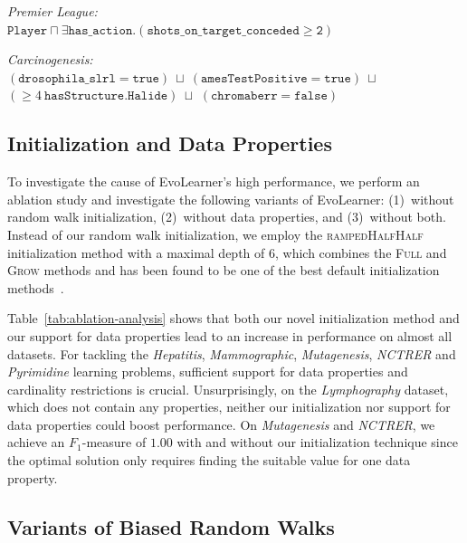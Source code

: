 \medskip

\noindent
\emph{Premier League:}\quad\\
$\texttt{Player} \sqcap \exists \texttt{has\_action.}(\texttt{shots\_on\_target\_conceded} \geq \texttt{2})$

\medskip

\noindent
\emph{Carcinogenesis:}\quad\\
$(\texttt{drosophila\_slrl} = \texttt{true}) \ \sqcup \ (\texttt{amesTestPositive} = \texttt{true}) \ \sqcup$
$(\geq 4 \ \texttt{hasStructure.Halide}) \ \sqcup$
$(\texttt{chromaberr} = \texttt{false})$



\subsection{Initialization and Data Properties}%
\label{subsec:evaluation-ablation-analysis}

To investigate the cause of EvoLearner's high performance, we perform an ablation study and investigate the following variants of EvoLearner: (1)~without random walk initialization, (2)~without data properties, and (3)~without both. Instead of our random walk initialization, we employ the \textsc{rampedHalfHalf} initialization method with a maximal depth of 6, which combines the \textsc{Full} and \textsc{Grow} methods and has been found to be one of the best default initialization methods~\citep{Koza1992GP}.

Table~\ref{tab:ablation-analysis} shows that both our novel initialization method and our support for data properties lead to an increase in performance on almost all datasets. For tackling the \textit{Hepatitis}, \textit{Mammographic}, \textit{Mutagenesis}, \textit{NCTRER} and \textit{Pyrimidine} learning problems, sufficient support for data properties and cardinality restrictions is crucial. Unsurprisingly, on the \textit{Lymphography} dataset, which does not contain any properties, neither our initialization nor support for data properties could boost performance. On \textit{Mutagenesis} and \textit{NCTRER}, we achieve an $F_1$-measure of $1.00$ with and without our initialization technique since the optimal solution only requires finding the suitable value for one data property.

\subsection{Variants of Biased Random Walks}%
\label{subsec:evaluation-walk-variants}

